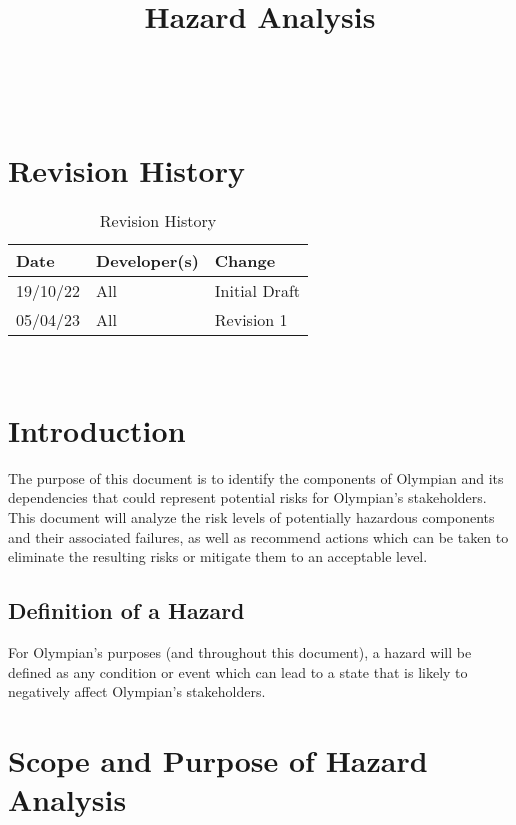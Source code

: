 \documentclass{article}
\title{Hazard Analysis\\\progname}
\author{\authname}
\date{}
\begin{document}
	
	\maketitle
	\thispagestyle{empty}
	
	~\newpage
	

	\tableofcontents

	\newpage

	\section{Revision History}
	
	\begin{table}[hp]
		\caption{Revision History} \label{TblRevisionHistory}
		\begin{tabularx}{\textwidth}{llX}
			\toprule
			\textbf{Date} & \textbf{Developer(s)} & \textbf{Change}\\
			\midrule
			19/10/22 & All & Initial Draft\\
			05/04/23 & All & Revision 1\\
			\bottomrule
		\end{tabularx}
	\end{table}
	
	~\newpage
	
	
	\section{Introduction}
	
	The purpose of this document is to identify the components of Olympian and its dependencies that could represent potential risks for Olympian's stakeholders. This document will analyze the risk levels of potentially hazardous components and their associated failures, as well as recommend actions which can be taken to eliminate the resulting risks or mitigate them to an acceptable level.
	
	\subsection{Definition of a Hazard}
	For Olympian's purposes (and throughout this document), a hazard will be defined as any condition or event which can lead to a state that is likely to negatively affect Olympian's stakeholders.
	
	\section{Scope and Purpose of Hazard Analysis}
\end{document}
